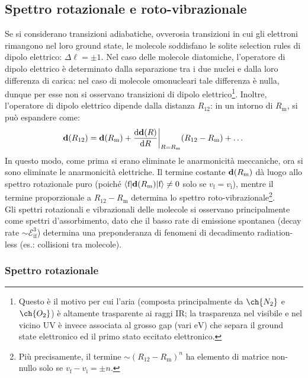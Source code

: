 \subsection{Spettro rotazionale e roto-vibrazionale}

Se si considerano transizioni adiabatiche, ovverosia transizioni in cui gli elettroni rimangono nel loro ground state, le molecole soddisfano le solite selection rules di dipolo elettrico: $ \Delta \ell = \pm 1 $.
Nel caso delle molecole diatomiche, l'operatore di dipolo elettrico è determinato dalla separazione tra i due nuclei e dalla loro differenza di carica: nel caso di molecole omonucleari tale differenza è nulla, dunque per esse non si osservano transizioni di dipolo elettrico\footnote{Questo è il motivo per cui l'aria (composta principalmente da $ \ch{N_2} $ e $ \ch{O_2} $) è altamente trasparente ai raggi IR; la trasparenza nel visibile e nel vicino UV è invece associata al grosso gap (vari $ \text{eV} $) che separa il ground state elettronico ed il primo stato eccitato elettronico.}. Inoltre, l'operatore di dipolo elettrico dipende dalla distanza $ R_{12} $: in un intorno di $ R_\text{m} $, si può espandere come:
\begin{equation*}
	\mathbf{d}(R_{12}) = \mathbf{d}(R_\text{m}) + \frac{\mathrm{d} \mathbf{d}(R)}{\mathrm{d} R}\bigg\vert_{R = R_\text{m}} (R_{12} - R_\text{m}) + \dots
\end{equation*}
In questo modo, come prima si erano eliminate le anarmonicità meccaniche, ora si sono eliminate le anarmonicità elettriche. Il termine costante $ \mathbf{d}(R_\text{m}) $ dà luogo allo spettro rotazionale puro (poiché $ \braket{\text{f} | \mathbf{d}(R_\text{m}) | \text{f}} \neq 0 $ solo se $ v_\text{f} = v_\text{i} $), mentre il termine proporzionale a $ R_{12} - R_\text{m} $ determina lo spettro roto-vibrazionale\footnote{Più precisamente, il termine $ \sim (R_{12} - R_\text{m})^n $ ha elemento di matrice non-nullo solo se $ v_\text{f} - v_\text{i} = \pm n $.}. \\
Gli spettri rotazionali e vibrazionali delle molecole si osservano principalmente come spettri d'assorbimento, dato che il basso rate di emissione spontanea (decay rate $ \sim \mathcal{E}_\text{if}^3 $) determina una preponderanza di fenomeni di decadimento radiation-less (es.: collisioni tra molecole).

\subsubsection{Spettro rotazionale}

